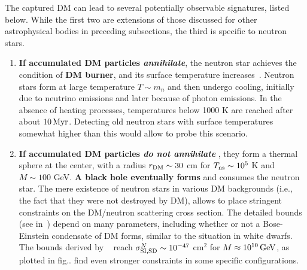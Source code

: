 The captured DM can lead to several potentially observable signatures, listed below. 
While the first two are extensions of those discussed for other astrophysical bodies in preceding subsections, the third is specific to neutron stars.
\begin{enumerate}
\item \label{DMinSN1} 
{\bf If accumulated DM particles {\em annihilate}}, the neutron star achieves the condition of {\bf DM burner}, 
and its surface temperature increases~\cite{DMcaptureinNSandannihil}. 
Neutron stars form at large temperature $T \sim m_n$ and then undergo cooling, initially due to neutrino emissions and later because of photon emissions. 
In the absence of heating processes, temperatures below 1000 K are reached after about $10\,{\rm Myr}$. 
Detecting old neutron stars with surface temperatures somewhat higher than this would allow to probe this scenario. 



\item {\bf If accumulated DM particles {\em do not annihilate}} \cite{DMcaptureinNSandcollapse}, 
they form a thermal sphere at the center, with a radius $r_{\rm DM} \sim 30$ cm for $T_{\rm ns} \sim 10^5$ K and $M \sim 100$ GeV. 
{\bf A  black hole eventually forms} and consumes the neutron star. 
The mere existence of neutron stars in various DM backgrounds (i.e., the fact that they were not destroyed by DM),  allows to place stringent constraints on the DM/neutron scattering cross section. The detailed bounds (see in~\cite{DMcaptureinNSandcollapse}) depend on many parameters, including whether or not a Bose-Einstein condensate of DM forms, similar to the situation in white dwarfs. 
The bounds derived by ~\cite{DMcaptureinNSandcollapse} reach $\sigma_{\rm SI,SD}^{N} \sim 10^{-47}$ cm$^2$ for $M \approx 10^{10}\,{\rm GeV}$,
as plotted in fig.. 
 find even stronger constraints in some specific configurations.


\end{enumerate}
